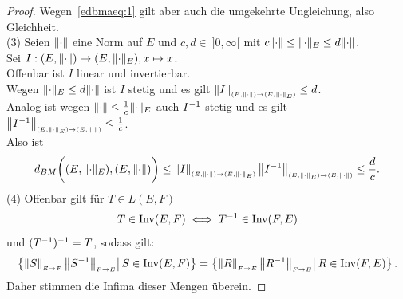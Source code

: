 \begin{proof}
Wegen~\eqref{edbmaeq:1} gilt aber auch die umgekehrte Ungleichung, also
Gleichheit.\\
(3) Seien $\lVert\cdot\rVert$ eine Norm auf $E$ und $c, d \in\!\ ]0,\infty[$
mit $c \lVert\cdot\rVert \le \lVert\cdot\rVert_E \le d \lVert\cdot\rVert$.\\
Sei $I : (E, \lVert\cdot\rVert) \rightarrow (E, \lVert\cdot\rVert_E), x \mapsto x$.\\
Offenbar ist $I$ linear und invertierbar.\\
Wegen $\lVert\cdot\rVert_E \le d \lVert\cdot\rVert$ ist $I$ stetig und es gilt
$\left\|I\right\|_{\scriptscriptstyle{(E, \lVert\cdot\rVert) \rightarrow (E, \lVert\cdot\rVert_E)}} \le d$.\\
Analog ist wegen $\lVert\cdot\rVert \le \frac 1 c \lVert\cdot\rVert_E$ auch $I^{-1}$ stetig
und es gilt $\left\|I^{-1}\right\|_{\scriptscriptstyle{(E, \lVert\cdot\rVert_E) \rightarrow (E, \lVert\cdot\rVert)}}\le\frac 1c$.\\
Also ist
\[d_{BM}\bigg((E, \lVert\cdot\rVert_E), (E, \lVert\cdot\rVert) \bigg) \le
\left\|I\right\|_{\scriptscriptstyle{(E, \lVert\cdot\rVert) \rightarrow (E, \lVert\cdot\rVert_E)}}
\left\|I^{-1}\right\|_{\scriptscriptstyle{(E, \lVert\cdot\rVert_E) \rightarrow (E, \lVert\cdot\rVert)}} \le \frac d c\text.\]
(4) Offenbar gilt für $T \in L(E, F)$
\[T \in \mathop{\textrm{Inv}}\nolimits(E, F) \iff T^{-1} \in \mathop{\textrm{Inv}}\nolimits(F, E)\]
und $(T^{-1})^{-1} = T$, sodass gilt:
\[\mengea{\opnorm S E F \opnorm{S\inv}FE}{S \in \Inv(E, F)}
= \mengea{\opnorm R F E \opnorm{R\inv}FE}{R \in \Inv(F, E)}\text.\]
Daher stimmen die Infima dieser Mengen überein.
\end{proof}